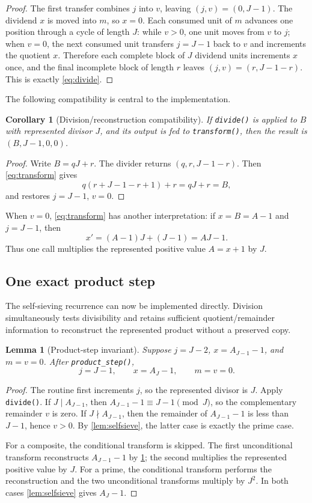 \documentclass[10pt]{article}
\newtheorem{lemma}[theorem]{Lemma}
\newtheorem{corollary}[theorem]{Corollary}
\theoremstyle{definition}
\begin{document}
\begin{proof}
The first transfer combines $j$ into $v$, leaving $(j,v)=(0,J-1)$. The
dividend $x$ is moved into $m$, so $x=0$. Each consumed unit of $m$ advances
one position through a cycle of length $J$: while $v>0$, one unit moves from
$v$ to $j$; when $v=0$, the next consumed unit transfers $j=J-1$ back to $v$
and increments the quotient $x$. Therefore each complete block of $J$ dividend
units increments $x$ once, and the final incomplete block of length $r$ leaves
$(j,v)=(r,J-1-r)$. This is exactly \eqref{eq:divide}.
\end{proof}

The following compatibility is central to the implementation.

\begin{corollary}[Division/reconstruction compatibility]
\label{cor:reconstruct}
If \texttt{divide()} is applied to $B$ with represented divisor $J$, and its
output is fed to \texttt{transform()}, then the result is $(B,J-1,0,0)$.
\end{corollary}

\begin{proof}
Write $B=qJ+r$. The divider returns $(q,r,J-1-r)$. Then \eqref{eq:transform}
gives
\[
q(r+J-1-r+1)+r=qJ+r=B,
\]
and restores $j=J-1$, $v=0$.
\end{proof}

When $v=0$, \eqref{eq:transform} has another interpretation: if $x=B=A-1$ and
$j=J-1$, then
\[
x'=(A-1)J+(J-1)=AJ-1.
\]
Thus one call multiplies the represented positive value $A=x+1$ by $J$.

\subsection{One exact product step}

The self-sieving recurrence can now be implemented directly. Division
simultaneously tests divisibility and retains sufficient quotient/remainder
information to reconstruct the represented product without a preserved copy.

\begin{lemma}[Product-step invariant]
\label{lem:productstep}
Suppose $j=J-2$, $x=A_{J-1}-1$, and $m=v=0$. After \texttt{product\_step()},
\[
j=J-1,
\qquad
x=A_J-1,
\qquad
m=v=0.
\]
\end{lemma}

\begin{proof}
The routine first increments $j$, so the represented divisor is $J$. Apply
\texttt{divide()}. If $J\mid A_{J-1}$, then $A_{J-1}-1\equiv J-1\pmod J$, so
the complementary remainder $v$ is zero. If $J\nmid A_{J-1}$, then the
remainder of $A_{J-1}-1$ is less than $J-1$, hence $v>0$. By
\cref{lem:selfsieve}, the latter case is exactly the prime case.

For a composite, the conditional transform is skipped. The first unconditional
transform reconstructs $A_{J-1}-1$ by \cref{cor:reconstruct}; the second
multiplies the represented positive value by $J$. For a prime, the conditional
transform performs the reconstruction and the two unconditional transforms
multiply by $J^2$. In both cases \cref{lem:selfsieve} gives $A_J-1$.
\end{proof}
\end{document}
